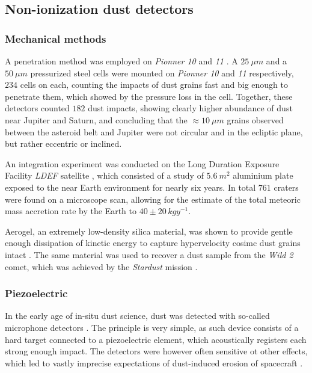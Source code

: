 \subsection{Non-ionization dust detectors}

\subsubsection{Mechanical methods} 

A penetration method was employed on \textit{Pionner 10} and \textit{11} \citep{humes1980results}. A $\SI{25}{\mu m}$ and a $\SI{50}{\mu m}$ pressurized steel cells were mounted on \textit{Pionner 10} and \textit{11} respectively, $234$ cells on each, counting the impacts of dust grains fast and big enough to penetrate them, which showed by the pressure loss in the cell. Together, these detectors counted $182$ dust impacts, showing clearly higher abundance of dust near Jupiter and Saturn, and concluding that the $\approx \SI{10}{\mu m}$ grains observed between the asteroid belt and Jupiter were not circular and in the ecliptic plane, but rather eccentric or inclined. 

An integration experiment was conducted on the Long Duration Exposure Facility \textit{LDEF} satellite \citep{love1993direct}, which consisted of a study of $\SI{5.6}{m^2}$ aluminium plate exposed to the near Earth environment for nearly six years. In total $761$ craters were found on a microscope scan, allowing for the estimate of the total meteoric mass accretion rate by the Earth to $40 \pm 20 \, \si{kg y^{-1}}$. 

Aerogel, an extremely low-density silica material, was shown to provide gentle enough dissipation of kinetic energy to capture hypervelocity cosimc dust grains intact \citep{tsou1995silica}. The same material was used to recover a dust sample from the \textit{Wild 2} comet, which was achieved by the \textit{Stardust} mission \citep{brownlee2014stardust}. 

\subsubsection{Piezoelectric}

In the early age of in-situ dust science, dust was detected with so-called microphone detectors \citep{alexander1963review}. The principle is very simple, as such device consists of a hard target connected to a piezoelectric element, which acoustically registers each strong enough impact. The detectors were however often sensitive ot other effects, which led to vastly imprecise expectations of dust-induced erosion of spacecraft \citep{whipple1958meteoritic}. 

